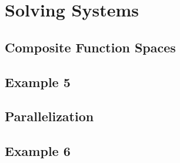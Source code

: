 \section{Solving Systems}

\subsection{Composite Function Spaces}

\subsection{Example 5}

\subsection{Parallelization}

\subsection{Example 6}
